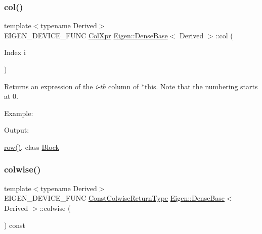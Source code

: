 \subsubsection{\texorpdfstring{col()}{col()}}
{\footnotesize\ttfamily template$<$typename Derived$>$ \\
E\+I\+G\+E\+N\+\_\+\+D\+E\+V\+I\+C\+E\+\_\+\+F\+U\+NC \mbox{\hyperlink{class_eigen_1_1_block}{Col\+Xpr}} \mbox{\hyperlink{class_eigen_1_1_dense_base}{Eigen\+::\+Dense\+Base}}$<$ Derived $>$\+::col (\begin{DoxyParamCaption}\item[{Index}]{i }\end{DoxyParamCaption})\hspace{0.3cm}{\ttfamily [inline]}}

\begin{DoxyReturn}{Returns}
an expression of the {\itshape i-\/th} column of $\ast$this. Note that the numbering starts at 0.
\end{DoxyReturn}
Example\+: 
\begin{DoxyCodeInclude}{0}
\end{DoxyCodeInclude}
 Output\+: 
\begin{DoxyVerbInclude}
\end{DoxyVerbInclude}
 \mbox{\hyperlink{class_eigen_1_1_dense_base_a4ea11afe36c7962c706caa93decd1380}{row()}}, class \mbox{\hyperlink{class_eigen_1_1_block}{Block}} \mbox{\label{class_eigen_1_1_dense_base_a978724c07b70cb9b8fdef67a4de08788}} 
\subsubsection{\texorpdfstring{colwise()}{colwise()}\hspace{0.1cm}{\footnotesize\ttfamily [1/2]}}
{\footnotesize\ttfamily template$<$typename Derived$>$ \\
E\+I\+G\+E\+N\+\_\+\+D\+E\+V\+I\+C\+E\+\_\+\+F\+U\+NC \mbox{\hyperlink{class_eigen_1_1_vectorwise_op}{Const\+Colwise\+Return\+Type}} \mbox{\hyperlink{class_eigen_1_1_dense_base}{Eigen\+::\+Dense\+Base}}$<$ Derived $>$\+::colwise (\begin{DoxyParamCaption}{ }\end{DoxyParamCaption}) const\hspace{0.3cm}{\ttfamily [inline]}}


